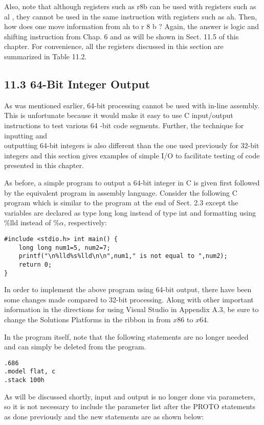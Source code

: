 \documentclass[10pt]{article}
\begin{document}
Also, note that although registers such as r8b can be used with registers such as al , they cannot be used in the same instruction with registers such as ah. Then, how does one move information from ah to r 8 b ? Again, the answer is logic and shifting instruction from Chap. 6 and as will be shown in Sect. 11.5 of this chapter. For convenience, all the registers discussed in this section are summarized in Table 11.2.

\subsection*{11.3 64-Bit Integer Output}
As was mentioned earlier, 64-bit processing cannot be used with in-line assembly. This is unfortunate because it would make it easy to use C input/output instructions to test various 64 -bit code segments. Further, the technique for inputting and\\
outputting 64-bit integers is also different than the one used previously for 32-bit integers and this section gives examples of simple I/O to facilitate testing of code presented in this chapter.

As before, a simple program to output a 64-bit integer in C is given first followed by the equivalent program in assembly language. Consider the following C program which is similar to the program at the end of Sect. 2.3 except the variables are declared as type long long instead of type int and formatting using \%lld instead of $\% \alpha$, respectively:

\begin{verbatim}
#include <stdio.h> int main() {
    long long num1=5, num2=7;
    printf("\n%lld%s%lld\n\n",num1," is not equal to ",num2);
    return 0;
}
\end{verbatim}

In order to implement the above program using 64-bit output, there have been some changes made compared to 32-bit processing. Along with other important information in the directions for using Visual Studio in Appendix A.3, be sure to change the Solutions Platforms in the ribbon in from $x 86$ to $x 64$.

In the program itself, note that the following statements are no longer needed and can simply be deleted from the program.

\begin{verbatim}
.686
.model flat, c
.stack 100h
\end{verbatim}

As will be discussed shortly, input and output is no longer done via parameters, so it is not necessary to include the parameter list after the PROTO statements as done previously and the new statements are as shown below:
\end{document}
